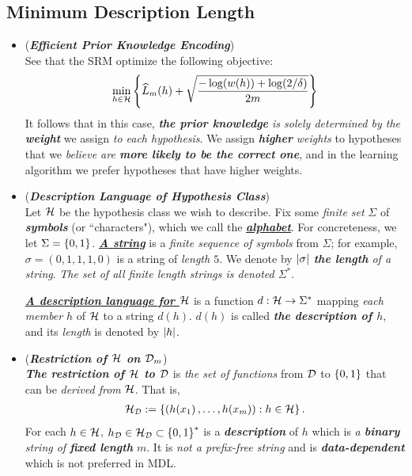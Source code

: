 \documentclass[11pt]{article}
\begin{document}
\subsection{Minimum Description Length}
\begin{itemize}
\item \begin{remark} (\emph{\textbf{Efficient Prior Knowledge Encoding}})\\
See that the SRM optimize the following objective:
\begin{align*}
 \min_{h \in {\mathcal H}}\left\{\widehat{L}_{m}(h) + \sqrt{\frac{-\log(w(h)) + \log(2/\delta)}{2m}}\right\} 
\end{align*} It follows that in this case, \emph{\textbf{the prior knowledge} is solely determined by the \textbf{weight}} we assign \emph{to each hypothesis}. We assign \textit{\textbf{higher}} \emph{weights} to hypotheses that we \emph{believe are \textbf{more likely to be the correct one}}, and in the learning algorithm we prefer hypotheses that have higher weights.
\end{remark}

\item \begin{definition} (\textbf{\emph{Description Language of Hypothesis Class}}) \\
Let ${\mathcal H}$ be the hypothesis class we wish to describe. Fix some \emph{finite set} $\Sigma$ of \emph{\textbf{symbols}} (or ``characters"), which we call the \underline{\emph{\textbf{alphabet}}}. For concreteness, we let $\Sigma = \left\{0,1\right\}$.  \underline{\emph{\textbf{A string}}} is a \emph{finite sequence of symbols} from $\Sigma$; for example,  $\sigma = (0,1,1,1,0)$ is a string of \emph{length $5$}. We denote by $\left\lvert \sigma \right\rvert$ \emph{\textbf{the length} of a string}. \emph{The set of all finite length strings is denoted $\Sigma^{*}$}. 

\underline{\emph{\textbf{A description language for ${\mathcal H}$}}} is a function $d: {\mathcal H} \to \Sigma^{*}$ mapping \emph{each member} $h$ of ${\mathcal H}$ to a string $d(h)$. $d(h)$ is called \emph{\textbf{the description of $h$}}, and its \emph{length} is denoted by $\left\lvert h \right\rvert$.
\end{definition}

\item \begin{remark} (\emph{\textbf{Restriction of ${\mathcal H}$ on ${\mathcal D}_m$}})\\
\emph{\textbf{The restriction of ${\mathcal H}$ to ${\mathcal D}$}} is \emph{the set of functions} from ${\mathcal D}$ to $\left\{0,1\right\}$ that can be \emph{derived from} ${\mathcal H}$. That is,
\begin{align*}
{\mathcal H}_{{\mathcal D}} := \left\{(h(x_1) \,{,}\ldots{,}\, h(x_m)): h \in {\mathcal H}\right\}.
\end{align*} For each $h \in {\mathcal H}$, $h_{{\mathcal D}} \in {\mathcal H}_{{\mathcal D}} \subset \left\{0, 1\right\}^{*}$ is a \emph{\textbf{description}} of $h$ which is \emph{a \textbf{binary} string of \textbf{fixed length} $m$}. It is \emph{not a prefix-free string} and is \emph{\textbf{data-dependent}} which is not preferred in MDL.
\end{remark}


\end{itemize}
\end{document}
